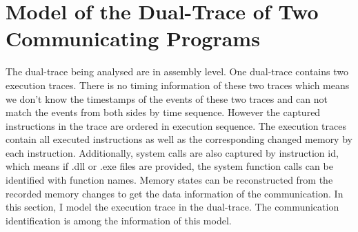 \section{Model of the Dual-Trace of Two Communicating Programs}
The dual-trace being analysed are in assembly level. One dual-trace contains two execution traces. There is no timing information of these two traces which means we don't know the timestamps of the events of these two traces and can not match the events from both sides by time sequence. However the captured instructions in the trace are ordered in execution sequence. The execution traces contain all executed instructions as well as the corresponding changed memory by each instruction. Additionally, system calls are also captured by instruction id, which means if .dll or .exe files are provided, the system function calls can be identified with function names. Memory states can be reconstructed from the recorded memory changes to get the data information of the communication. In this section, I model the execution trace in the dual-trace. The communication identification is among the information of this model.

